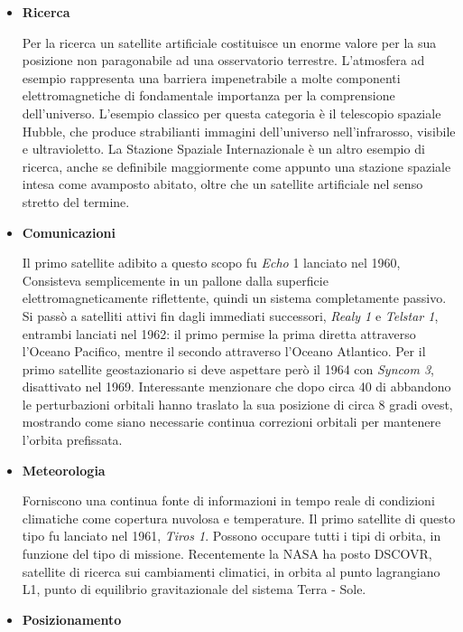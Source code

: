 \documentclass[12pt,a4paper,oneside]{book}
\begin{document}
			\begin{itemize}
				\item {\bf Ricerca}
				
				Per la ricerca un satellite artificiale costituisce un enorme valore per la sua posizione non paragonabile ad una osservatorio terrestre. L'atmosfera ad esempio rappresenta una barriera impenetrabile a molte componenti elettromagnetiche di fondamentale importanza per la comprensione dell'universo. L'esempio classico per questa categoria è il telescopio spaziale Hubble, che produce strabilianti immagini dell'universo nell'infrarosso, visibile e ultravioletto. La Stazione Spaziale Internazionale è un altro esempio di ricerca, anche se definibile maggiormente come appunto una stazione spaziale intesa come avamposto abitato, oltre che un satellite artificiale nel senso stretto del termine.
				
				\item {\bf Comunicazioni}
				
				Il primo satellite adibito a questo scopo fu {\it Echo} 1 lanciato nel 1960, Consisteva semplicemente in un pallone dalla superficie elettromagneticamente riflettente, quindi un sistema completamente passivo. Si passò a satelliti attivi fin dagli immediati successori, {\it Realy 1} e {\it Telstar 1}, entrambi lanciati nel 1962: il primo permise la prima diretta attraverso l'Oceano Pacifico, mentre il secondo attraverso l'Oceano Atlantico. Per il primo satellite geostazionario si deve aspettare però il 1964 con {\it Syncom 3}, disattivato nel 1969. Interessante menzionare che dopo circa 40 di abbandono le perturbazioni orbitali hanno traslato la sua posizione di circa 8 gradi ovest, mostrando come siano necessarie continua correzioni orbitali per mantenere l'orbita prefissata.
				
				\item {\bf Meteorologia}
				
				Forniscono una continua fonte di informazioni in tempo reale di condizioni climatiche come copertura nuvolosa e temperature. Il primo satellite di questo tipo fu lanciato nel 1961, {\it Tiros 1}. Possono occupare tutti i tipi di orbita, in funzione del tipo di missione. Recentemente la NASA ha posto DSCOVR, satellite di ricerca sui cambiamenti climatici, in orbita al punto lagrangiano L1, punto di equilibrio gravitazionale del sistema Terra - Sole.
				
				\item {\bf Posizionamento}
				

\end{itemize}
\end{document}
